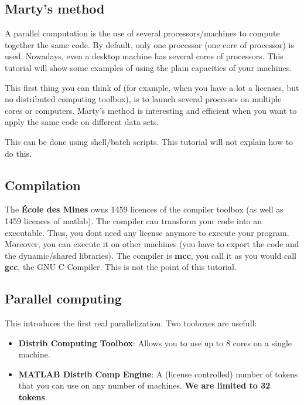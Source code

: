 \documentclass{emse-exo}
\begin{document}
\subsection{Marty's method}
A parallel computation is the use of several processors/machines to compute together the same code. By default, only one processor (one core of processor) is used. Nowadays, even a desktop machine has several cores of processors. This tutorial will show some examples of using the plain capacities of your machines.

This first thing you can think of (for example, when you have a lot a \matlabregistered{} licenses, but no distributed computing toolbox), is to launch several \matlabregistered{} processes on multiple cores or computers. Marty's method is interesting and efficient when you want to apply the same code on different data sets.

This can be done using shell/batch scripts. This tutorial will not explain how to do this.

\subsection{Compilation}
The \textbf{\'Ecole des Mines} owns 1459 licences of the compiler toolbox (as well as 1459 licences of matlab). The compiler can transform your \matlabregistered{} code into an executable. Thus, you dont need any license anymore to execute your program. Moreover, you can execute it on other machines (you have to export the code and the \matlabregistered{} dynamic/shared libraries). The compiler is \textbf{mcc}, you call it as you would call \textbf{gcc}, the GNU C Compiler. This is not the point of this tutorial.

\subsection{Parallel computing}

This introduces the first real parallelization. Two \matlabregistered{} tooboxes are usefull:
\begin{itemize}
 \item \textbf{Distrib Computing Toolbox}: Allows you to use up to 8 cores on a single machine.
 \item \textbf{MATLAB Distrib Comp Engine}: A (license controlled) number of tokens that you can use on any number of machines. \textbf{We are limited to 32 tokens}.
\end{itemize}
\end{document}
